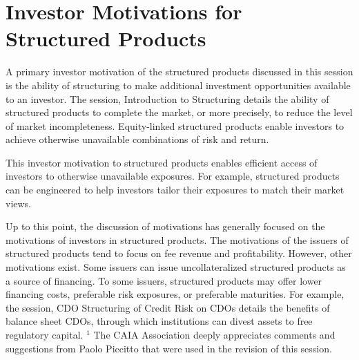 \documentclass[11pt]{article}
\begin{document}
\section*{Investor Motivations for Structured Products}
A primary investor motivation of the structured products discussed in this session is the ability of structuring to make additional investment opportunities available to an investor. The session, Introduction to Structuring details the ability of structured products to complete the market, or more precisely, to reduce the level of market incompleteness. Equity-linked structured products enable investors to achieve otherwise unavailable combinations of risk and return.

This investor motivation to structured products enables efficient access of investors to otherwise unavailable exposures. For example, structured products can be engineered to help investors tailor their exposures to match their market views.

Up to this point, the discussion of motivations has generally focused on the motivations of investors in structured products. The motivations of the issuers of structured products tend to focus on fee revenue and profitability. However, other motivations exist. Some issuers can issue uncollateralized structured products as a source of financing. To some issuers, structured products may offer lower financing costs, preferable risk exposures, or preferable maturities. For example, the session, CDO Structuring of Credit Risk on CDOs details the benefits of balance sheet CDOs, through which institutions can divest assets to free regulatory capital. ${ }^{1}$ The CAIA Association deeply appreciates comments and suggestions from Paolo Piccitto that were used in the revision of this session.
\end{document}
